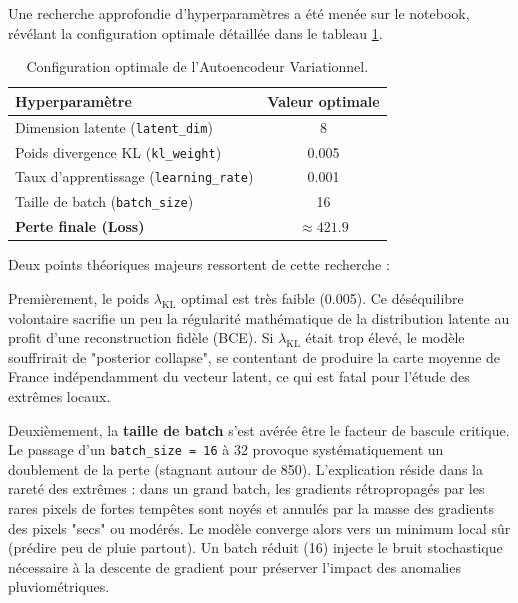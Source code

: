 \documentclass[11pt,a4paper]{article}
\begin{document}
Une recherche approfondie d'hyperparamètres a été menée sur le notebook, révélant la configuration optimale détaillée dans le tableau \ref{tab:vae-params}.

\begin{table}[H]
    \centering
    \caption{Configuration optimale de l'Autoencodeur Variationnel.}
    \label{tab:vae-params}
    \small
    \begin{tabular}{lc}
        \toprule
        \textbf{Hyperparamètre} & \textbf{Valeur optimale} \\
        \midrule
        Dimension latente (\texttt{latent\_dim}) & 8 \\
        Poids divergence KL (\texttt{kl\_weight}) & 0.005 \\
        Taux d'apprentissage (\texttt{learning\_rate}) & 0.001 \\
        Taille de batch (\texttt{batch\_size}) & 16 \\
        \midrule
        \textbf{Perte finale (Loss)} & $\approx 421.9$ \\
        \bottomrule
    \end{tabular}
\end{table} 

Deux points théoriques majeurs ressortent de cette recherche :

Premièrement, le poids $\lambda_{\mathrm{KL}}$ optimal est très faible (0.005). Ce déséquilibre volontaire sacrifie un peu la régularité mathématique de la distribution latente au profit d'une reconstruction fidèle (BCE). Si $\lambda_{\mathrm{KL}}$ était trop élevé, le modèle souffrirait de "posterior collapse", se contentant de produire la carte moyenne de France indépendamment du vecteur latent, ce qui est fatal pour l'étude des extrêmes locaux.

Deuxièmement, la \textbf{taille de batch} s'est avérée être le facteur de bascule critique. Le passage d'un \texttt{batch\_size = 16} à 32 provoque systématiquement un doublement de la perte (stagnant autour de 850). L'explication réside dans la rareté des extrêmes : dans un grand batch, les gradients rétropropagés par les rares pixels de fortes tempêtes sont noyés et annulés par la masse des gradients des pixels "secs" ou modérés. Le modèle converge alors vers un minimum local sûr (prédire peu de pluie partout). Un batch réduit (16) injecte le bruit stochastique nécessaire à la descente de gradient pour préserver l'impact des anomalies pluviométriques.
\end{document}

